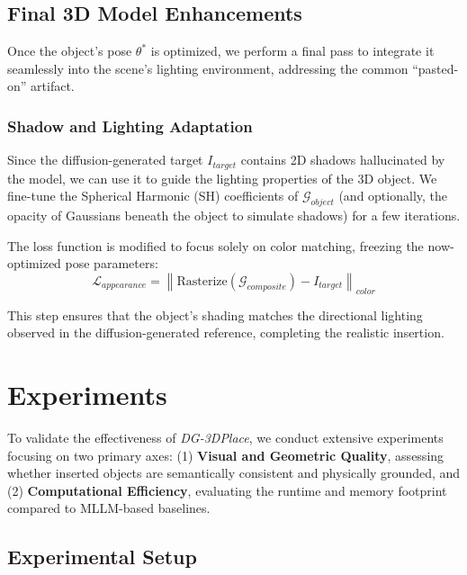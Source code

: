 \documentclass[pdflatex,sn-mathphys-num]{sn-jnl}%
\theoremstyle{thmstyleone}%
\theoremstyle{thmstyletwo}%
\theoremstyle{thmstylethree}%
\begin{document}
\subsection{Final 3D Model Enhancements}
Once the object's pose $\theta^*$ is optimized, we perform a final pass to integrate it seamlessly into the scene's lighting environment, addressing the common ``pasted-on'' artifact.

\subsubsection{Shadow and Lighting Adaptation}
Since the diffusion-generated target $I_{target}$ contains 2D shadows hallucinated by the model, we can use it to guide the lighting properties of the 3D object. We fine-tune the Spherical Harmonic (SH) coefficients of $\mathcal{G}_{object}$ (and optionally, the opacity of Gaussians beneath the object to simulate shadows) for a few iterations.

The loss function is modified to focus solely on color matching, freezing the now-optimized pose parameters:
\[
\mathcal{L}_{appearance}
= \left\|
\text{Rasterize}(\mathcal{G}_{composite}) - I_{target}
\right\|_{color}
\]

This step ensures that the object's shading matches the directional lighting observed in the diffusion-generated reference, completing the realistic insertion.

\section{Experiments}\label{sec:experiments}

To validate the effectiveness of \textit{DG-3DPlace}, we conduct extensive experiments focusing on two primary axes: (1) \textbf{Visual and Geometric Quality}, assessing whether inserted objects are semantically consistent and physically grounded, and (2) \textbf{Computational Efficiency}, evaluating the runtime and memory footprint compared to MLLM-based baselines.

\subsection{Experimental Setup}
\end{document}

